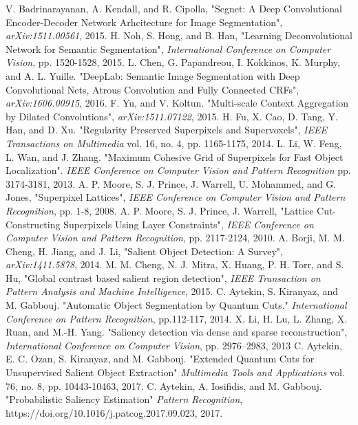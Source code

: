 \documentclass[a4paper,conference]{IEEEtran}
\begin{document}
\begin{thebibliography}{1}
V. Badrinarayanan, A. Kendall, and R. Cipolla, "Segnet: A Deep Convolutional Encoder-Decoder Network Arhcitecture for Image Segmentation", \emph{arXiv:1511.00561}, 2015.
H. Noh, S. Hong, and B. Han, "Learning Deconvolutional Network for Semantic Segmentation", \emph{International Conference on Computer Vision}, pp. 1520-1528, 2015.
L. Chen, G. Papandreou, I. Kokkinos, K. Murphy, and A. L. Yuille. "DeepLab: Semantic Image Segmentation with Deep Convolutional Nets, Atrous Convolution and Fully Connected CRFs", \emph{arXiv:1606.00915}, 2016.
F. Yu, and V. Koltun. "Multi-scale Context Aggregation by Dilated Convolutions", \emph{ 	arXiv:1511.07122}, 2015.
H. Fu, X. Cao, D. Tang, Y. Han, and D. Xu. "Regularity Preserved Superpixels and Supervoxels", \emph{IEEE Transactions on Multimedia} vol. 16, no. 4, pp. 1165-1175, 2014.
L. Li, W. Feng, L. Wan, and J. Zhang. "Maximum Cohesive Grid of Superpixels for Fast Object Localization". \emph{IEEE Conference on Computer Vision and Pattern Recognition} pp. 3174-3181, 2013.
A. P. Moore, S. J. Prince, J. Warrell, U. Mohammed, and G. Jones, "Superpixel Lattices", \emph{IEEE Conference on Computer Vision and Pattern Recognition}, pp. 1-8, 2008.
A. P. Moore, S. J. Prince, J. Warrell, "Lattice Cut-Constructing Superpixels Using Layer Constraints", \emph{IEEE Conference on Computer Vision and Pattern Recognition}, pp. 2117-2124, 2010.
A. Borji, M. M. Cheng, H. Jiang, and J. Li, "Salient Object Detection: A Survey", \emph{arXiv:1411.5878}, 2014.
M. M. Cheng, N. J. Mitra, X. Huang, P. H. Torr, and S. Hu, "Global contrast based salient region detection", \emph{IEEE Transaction on Pattern Analysis and Machine Intelligence}, 2015.
C. Aytekin, S. Kiranyaz, and M. Gabbouj. "Automatic Object Segmentation by Quantum Cuts." \emph{International Conference on Pattern Recognition}, pp.112-117, 2014.
X. Li, H. Lu, L. Zhang, X. Ruan, and M.-H. Yang. "Saliency detection via dense and sparse reconstruction", \emph{International Conference on Computer Vision}, pp. 2976–2983, 2013
C. Aytekin, E. C. Ozan, S. Kiranyaz, and M. Gabbouj. "Extended Quantum Cuts for Unsupervised Salient Object Extraction" \emph{Multimedia Tools and Applications} vol. 76, no. 8, pp. 10443-10463, 2017.
C. Aytekin, A. Iosifidis, and M. Gabbouj. "Probabilistic Saliency Estimation" \emph{Pattern Recognition}, https://doi.org/10.1016/j.patcog.2017.09.023, 2017.

\end{thebibliography}
\end{document}
